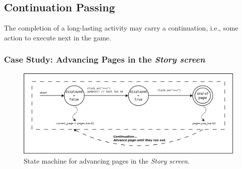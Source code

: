 \documentclass{vgtc}                          %
\begin{document}
\subsection{Continuation Passing}
\label{sec.pats.cps}

    The completion of a long-lasting activity may carry a continuation, i.e.,
    some action to execute next in the game.

\subsubsection{Case Study: Advancing Pages in the \emph{Story screen}}


\begin{figure}[t]
\centering
\includegraphics[width=\columnwidth]{story}
\caption{State machine for advancing pages in the \emph{Story screen}.
\label{fig.story}
}
\end{figure}
\end{document}
